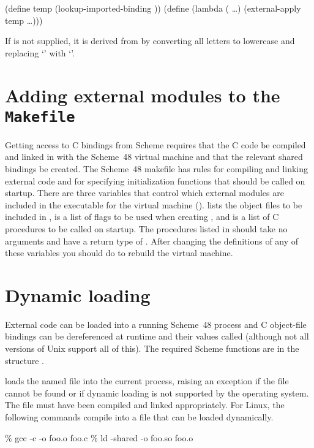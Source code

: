 \begin{example}
(define temp (lookup-imported-binding ))
(define 
  (lambda ( \ldots)
    (external-apply temp  \ldots)))
\end{example}

\noindent{}
If  is not supplied, it is derived from  by converting
 all letters to lowercase and replacing `\code{-}' with `\code{\_}'.

\section{Adding external modules to the {\tt Makefile}}
\label{sec:external-modules}

Getting access to C bindings from Scheme requires that the C code be
 compiled and linked in with the Scheme~48 virtual machine and that the
 relevant shared bindings be created.
The Scheme~48 makefile has rules for compiling and linking external code
 and for specifying initialization functions that should be called on
 startup.
There are three  variables that control which external modules are
 included in the executable for the virtual machine ().
 lists the object files to be included in
 ,
 is a list of  flags to be used when
 creating , and
  is a list of C procedures to be called
 on startup.
The procedures listed in  should take no
 arguments and have a return type of .
After changing the definitions of any of these variables you should
 do  to rebuild the virtual machine.

\section{Dynamic loading}
\label{dynamic-externals}

External code can be loaded into a running Scheme~48 process
 and C object-file bindings can be dereferenced at runtime and
 their values called
 (although not all versions of Unix support all of this).
The required Scheme functions are in the structure .

\begin{protos}
\end{protos}
\noindent
{} loads the named file into the current
 process, raising an exception if the file cannot be found or if dynamic
 loading is not supported by the operating system.
The file must have been compiled and linked appropriately.
For Linux, the following commands compile  into a
 file  that can be loaded dynamically.
\begin{example}
\% gcc -c -o foo.o foo.c
\% ld -shared -o foo.so foo.o
\end{example}

